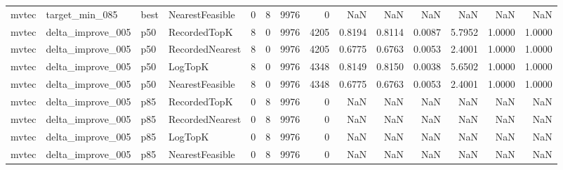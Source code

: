 \begin{tabular}{llllrrrrrrrrrr}
   mvtec &       target\_min\_085 &   best & NearestFeasible &           0 &          8 &           9976 &                   0 &            NaN &             NaN &                       NaN &            NaN &                    NaN &                     NaN \\
   mvtec &    delta\_improve\_005 &    p50 &    RecordedTopK &           8 &          0 &           9976 &                4205 &         0.8194 &          0.8114 &                    0.0087 &         5.7952 &                 1.0000 &                  1.0000 \\
   mvtec &    delta\_improve\_005 &    p50 & RecordedNearest &           8 &          0 &           9976 &                4205 &         0.6775 &          0.6763 &                    0.0053 &         2.4001 &                 1.0000 &                  1.0000 \\
   mvtec &    delta\_improve\_005 &    p50 &         LogTopK &           8 &          0 &           9976 &                4348 &         0.8149 &          0.8150 &                    0.0038 &         5.6502 &                 1.0000 &                  1.0000 \\
   mvtec &    delta\_improve\_005 &    p50 & NearestFeasible &           8 &          0 &           9976 &                4348 &         0.6775 &          0.6763 &                    0.0053 &         2.4001 &                 1.0000 &                  1.0000 \\
   mvtec &    delta\_improve\_005 &    p85 &    RecordedTopK &           0 &          8 &           9976 &                   0 &            NaN &             NaN &                       NaN &            NaN &                    NaN &                     NaN \\
   mvtec &    delta\_improve\_005 &    p85 & RecordedNearest &           0 &          8 &           9976 &                   0 &            NaN &             NaN &                       NaN &            NaN &                    NaN &                     NaN \\
   mvtec &    delta\_improve\_005 &    p85 &         LogTopK &           0 &          8 &           9976 &                   0 &            NaN &             NaN &                       NaN &            NaN &                    NaN &                     NaN \\
   mvtec &    delta\_improve\_005 &    p85 & NearestFeasible &           0 &          8 &           9976 &                   0 &            NaN &             NaN &                       NaN &            NaN &                    NaN &                     NaN \\

\end{tabular}
